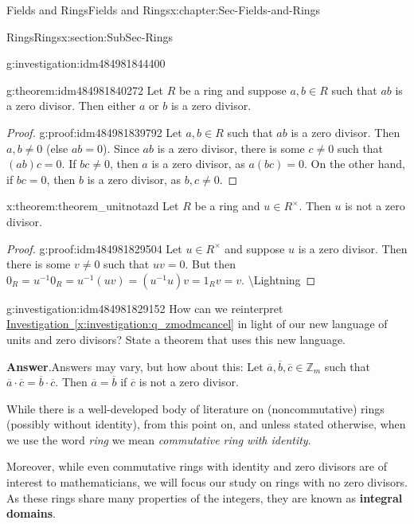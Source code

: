 \documentclass[oneside,10pt,]{book}
\newcommand{\blocktitlefont}{\relax}
\newcommand{\xreffont}{\relax}
\newcommand{\terminology}[1]{\textbf{#1}}
\numberwithin{equation}{section}
\def\Z{{\mathbb Z}}
\begin{document}
\begin{chapterptx}{Fields and Rings}{}{Fields and Rings}{}{}{x:chapter:Sec-Fields-and-Rings}
\begin{sectionptx}{Rings}{}{Rings}{}{}{x:section:SubSec-Rings}
\begin{investigation}{}{g:investigation:idm484981844400}
\end{investigation}
\begin{theorem}{}{}{g:theorem:idm484981840272}%
Let \(R\) be a ring and suppose \(a,b\in R\) such that \(ab\) is a zero divisor. Then either \(a\) or \(b\) is a zero divisor.%
\end{theorem}
\begin{proof}{}{g:proof:idm484981839792}
Let \(a,b\in R\) such that \(ab\) is a zero divisor. Then \(a,b\ne 0\) (else \(ab = 0\)). Since \(ab\) is a zero divisor, there is some \(c\ne 0\) such that \((ab) c = 0\). If \(bc\ne 0\), then \(a\) is a zero divisor, as \(a(bc) = 0\). On the other hand, if \(bc=0\), then \(b\) is a zero divisor, as \(b,c\ne 0\).%
\end{proof}
\begin{theorem}{}{}{x:theorem:theorem_unitnotazd}%
Let \(R\) be a ring and \(u\in R^\times\). Then \(u\) is not a zero divisor.%
\end{theorem}
\begin{proof}{}{g:proof:idm484981829504}
Let \(u\in R^\times\) and suppose \(u\) is a zero divisor. Then there is some \(v\ne 0\) such that \(uv = 0\). But then \(0_R = u^{-1} 0_R = u^{-1} (uv) = (u^{-1} u) v = 1_R v = v\). \textbackslash{}Lightning%
\end{proof}
\begin{investigation}{}{g:investigation:idm484981829152}%
How can we reinterpret \hyperref[x:investigation:q_zmodmcancel]{Investigation~{\xreffont\ref{x:investigation:q_zmodmcancel}}} in light of our new language of units and zero divisors? State a theorem that uses this new language.%
\par\smallskip%
\noindent\textbf{\blocktitlefont Answer}.\hypertarget{g:answer:idm484981825552}{}\quad{}Answers may vary, but how about this: Let \(\overline{a},\overline{b},\overline{c}\in \Z_m\) such that \(\overline{a}\cdot \overline{c} = \overline{b}\cdot \overline{c}\). Then \(\overline{a} = \overline{b}\) if \(\overline{c}\) is not a zero divisor.%
\end{investigation}
While there is a well-developed body of literature on (noncommutative) rings (possibly without identity), from this point on, and unless stated otherwise, when we use the word \emph{ring} we mean \emph{commutative ring with identity}.%
\par
Moreover, while even commutative rings with identity and zero divisors are of interest to mathematicians, we will focus our study on rings with no zero divisors. As these rings share many properties of the integers, they are known as \terminology{integral domains}.%

\end{sectionptx}
\end{chapterptx}
\end{document}
